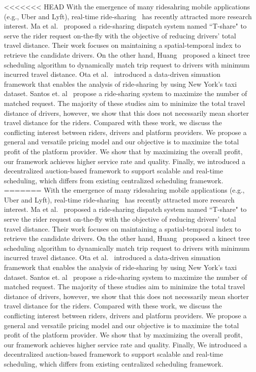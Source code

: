 <<<<<<< HEAD
With the emergence of many ridesahring mobile applications (e.g., Uber and Lyft), real-time ride-sharing~\cite{Ma13, Ma15, Huang14,Ota15, Cici15, Cao15, PelzerITS15} has recently attracted more research interest. Ma et al.~\cite{Ma13, Ma15} proposed a ride-sharing dispatch system named ``T-share" to serve the rider request on-the-fly with the objective of reducing drivers' total travel distance. Their work focuses on maintaining a spatial-temporal index to retrieve the candidate drivers. On the other hand, Huang~\cite{Huang14} proposed a kinect tree scheduling algorithm to dynamically match trip request to drivers with minimum incurred travel distance. Ota et al.~\cite{Ota15} introduced a data-driven simuation framework that enables the analysis of ride-sharing by using New York's taxi dataset. Santos et. al~\cite{SantosIjcai13} propose a ride-sharing system to maximize the number of matched request. The majority of these studies aim to minimize the total travel distance of drivers, however, we show that this does not necessarily mean shorter travel distance for the riders. Compared with these work, we discuss the conflicting interest between riders, drivers and platform providers. We propose a general and versatile pricing model and  our objective is to maximize the total profit of the platform provider. We show that by maximizing the overall profit, our framework achieves higher service rate and quality.  Finally, we introduced a decentralized auction-based framework to support scalable and real-time scheduling, which differs from existing centralized scheduling framework. 
=======
With the emergence of many ridesahring mobile applications (e.g., Uber and Lyft), real-time ride-sharing~\cite{Ma13, Ma15, Huang14,Ota15, Cici15, Cao15, PelzerITS15} has recently attracted more research interest. Ma et al.~\cite{Ma13, Ma15} proposed a ride-sharing dispatch system named ``T-share" to serve the rider request on-the-fly with the objective of reducing drivers' total travel distance. Their work focuses on maintaining a spatial-temporal index to retrieve the candidate drivers. On the other hand, Huang~\cite{Huang14} proposed a kinect tree scheduling algorithm to dynamically match trip request to drivers with minimum incurred travel distance. Ota et al.~\cite{Ota15} introduced a data-driven simuation framework that enables the analysis of ride-sharing by using New York's taxi dataset. Santos et. al~\cite{SantosIjcai13} propose a ride-sharing system to maximize the number of matched request. The majority of these studies aim to minimize the total travel distance of drivers, however, we show that this does not necessarily mean shorter travel distance for the riders. Compared with these work, we discuss the conflicting interest between riders, drivers and platform providers. We propose a general and versatile pricing model and  our objective is to maximize the total profit of the platform provider. We show that by maximizing the overall profit, our framework achieves higher service rate and quality.  Finally, We introduced a decentralized auction-based framework to support scalable and real-time scheduling, which differs from existing centralized scheduling framework. 
